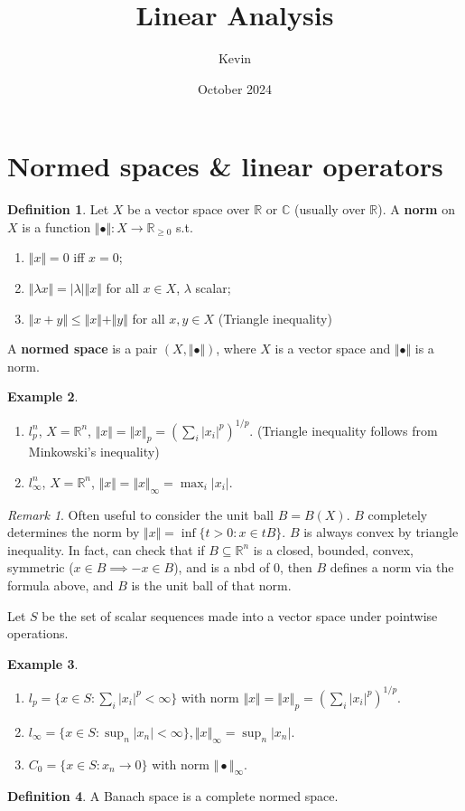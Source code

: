 \documentclass{article}
\title{Linear Analysis}
\author{Kevin}
\date{October 2024}
\theoremstyle{definition}
\newtheorem{defn}{Definition}[section]
\newtheorem{example}[defn]{Example}
\theoremstyle{remark}
\newtheorem{rem}{Remark}
\theoremstyle{plain}
\newcommand{\RR}{\mathbb{R}}
\newcommand{\CC}{\mathbb{C}}
\begin{document}
\maketitle

\section{Normed spaces \& linear operators}
\begin{defn}
    Let $X$ be a vector space over $\RR$ or $\CC$ (usually over $\RR$). A \textbf{norm} on $X$ is a function $\Vert\bullet\Vert:X\to\RR_{\ge0}$ s.t. 
    \begin{enumerate}
        \item $\Vert x\Vert=0$ iff $x=0$;
        \item $\Vert\lambda x\Vert=|\lambda|\Vert x\Vert$ for all $x\in X$, $\lambda$ scalar;
        \item $\Vert x+y\Vert\le\Vert x\Vert+\Vert y\Vert$ for all $x,y\in X$ (Triangle inequality)
    \end{enumerate}
    A \textbf{normed space} is a pair $(X,\Vert\bullet\Vert)$, where $X$ is a vector space and $\Vert\bullet\Vert$ is a norm.
\end{defn}
\begin{example}
\begin{enumerate}
    \item $l_p^n$, $X=\RR^n$, $\Vert x\Vert=\Vert x\Vert_p=\left(\sum_i|x_i|^p\right)^{1/p}$. (Triangle inequality follows from Minkowski's inequality)
    \item $l_\infty^n$, $X=\RR^n$, $\Vert x\Vert=\Vert x\Vert_\infty=\max_i|x_i|$.
\end{enumerate}
\end{example}
\begin{rem}
    Often useful to consider the unit ball $B=B(X)$. $B$ completely determines the norm by $\Vert x\Vert=\inf\{t>0:x\in tB\}$. $B$ is always convex by triangle inequality. In fact, can check that if $B\subseteq\RR^n$ is a closed, bounded, convex, symmetric ($x\in B\implies -x\in B$), and is a nbd of $0$, then $B$ defines a norm via the formula above, and $B$ is the unit ball of that norm.
\end{rem}
Let $S$ be the set of scalar sequences made into a vector space under pointwise operations.
\begin{example}
    \begin{enumerate}
        \item $l_p=\{x\in S\colon \sum_i|x_i|^p<\infty\}$ with norm $\Vert x\Vert=\Vert x\Vert_p=\left(\sum_i|x_i|^p\right)^{1/p}$.
        \item $l_\infty=\{x\in S:\sup_n|x_n|<\infty\},\Vert x\Vert_\infty=\sup_n|x_n|$.
        \item $C_0=\{x\in S:x_n\to 0\}$ with norm $\Vert\bullet\Vert_\infty$.
    \end{enumerate}
\end{example}
\begin{defn}
    A Banach space is a complete normed space.
\end{defn}
\end{document}
